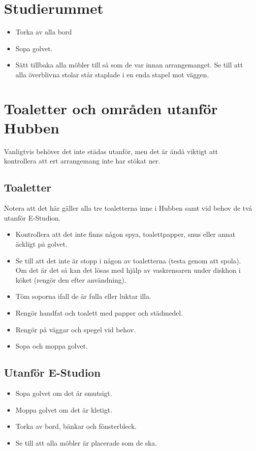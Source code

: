 \section{Studierummet}
\begin{itemize}
    \item Torka av alla bord
    \item Sopa golvet.
    \item Sätt tillbaka alla möbler till så som de var innan arrangemanget. Se till att alla överblivna stolar står staplade i en enda stapel mot väggen.
\end{itemize}

\section{Toaletter och områden utanför Hubben}
Vanligtvis behöver det inte städas utanför, men det är ändå viktigt att kontrollera att ert arrangemang inte har stökat ner.
\subsection{Toaletter}
Notera att det här gäller alla tre toaletterna inne i Hubben samt vid behov de två utanför E-Studion.
\begin{itemize}
    \item Kontrollera att det inte finns någon spya, toalettpapper, snus eller annat äckligt på golvet.
    \item Se till att det inte är stopp i någon av toaletterna (testa genom att spola). Om det är det så kan det lösas med hjälp av vaskrensaren under diskhon i köket (rengör den efter användning).
    \item Töm soporna ifall de är fulla eller luktar illa.
    \item Rengör handfat och toalett med papper och städmedel.
    \item Rengör på väggar och spegel vid behov.  
    \item Sopa och moppa golvet.
\end{itemize}

\subsection{Utanför E-Studion}
\begin{itemize}
    \item Sopa golvet om det är smutsigt.
    \item Moppa golvet om det är kletigt.
    \item Torka av bord, bänkar och fönsterbleck.
    \item Se till att alla möbler är placerade som de ska.
\end{itemize}

